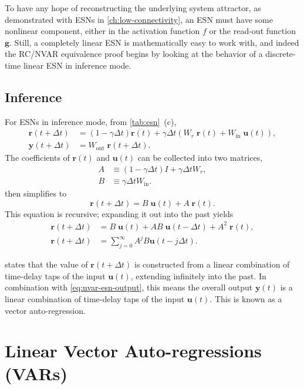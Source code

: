 To have any hope of reconstructing the underlying system attractor, as
demonstrated with ESNs in \cref{ch:low-connectivity}, an ESN must have some nonlinear component, either in the
activation function $f$ or the read-out function
$\bm{g}$. Still, a completely linear ESN is mathematically easy to
work with, and indeed the RC/NVAR equivalence proof begins by looking
at the behavior of a discrete-time linear ESN in inference mode.

\subsection{Inference}

For ESNs in inference mode, from \cref{tab:esn}~(c),
\begin{align}
  \bm{r}(t + \Delta t) &= (1 - \gamma \Delta t) \bm{r}(t) + \gamma \Delta t \left( W_r\;\bm{r}(t) + W_\text{in}\;\bm{u}(t) \right), \label{eq:nvar-esn} \\
  \bm{y}(t+\Delta t) &= W_\text{out}\;\bm{r}(t+\Delta t). \label{eq:nvar-esn-output}
\end{align}
The coefficients of $\bm{r}(t)$ and $\bm{u}(t)$ can be collected into two matrices,
\begin{align}
  A &\equiv (1 - \gamma \Delta t) I + \gamma \Delta t W_r, \\
  B &\equiv \gamma \Delta t W_\text{in}.
\end{align}
 then simplifies to
\begin{equation}
  \bm{r}(t + \Delta t) = B\;\bm{u}(t) + A\;\bm{r}(t).
\end{equation}
This equation is recursive; expanding it out into the past yields
\begin{align}
  \bm{r}(t + \Delta t) &= B\;\bm{u}(t) + AB\;\bm{u}(t - \Delta t) + A^2\;\bm{r}(t), \\
  \bm{r}(t + \Delta t) &= \sum_{j = 0}^\infty A^j B \bm{u}(t - j \Delta t). \label{eq:esn-var-mat}
\end{align}

 states that the value of $\bm{r}(t + \Delta t)$
is constructed from a linear combination of time-delay taps of the
input $\bm{u}(t)$, extending infinitely into the past.  In combination
with \cref{eq:nvar-esn-output}, this means the overall output
$\bm{y}(t)$ is a linear combination of time-delay taps of the input
$\bm{u}(t)$.  This is known as a vector auto-regression.

\section{Linear Vector Auto-regressions (VARs)}

